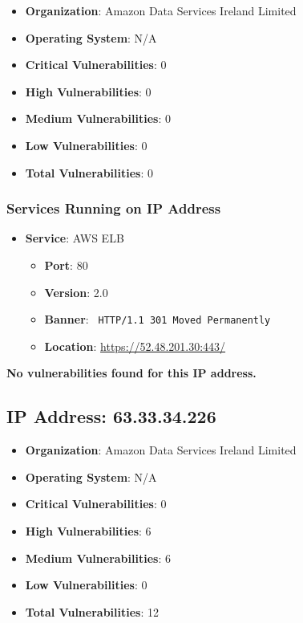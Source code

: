\documentclass{article}
\begin{document}
\begin{itemize}
    \item \textbf{Organization}: Amazon Data Services Ireland Limited
    \item \textbf{Operating System}:  N/A 
    \item \textbf{Critical Vulnerabilities}: 0
    \item \textbf{High Vulnerabilities}: 0
    \item \textbf{Medium Vulnerabilities}: 0
    \item \textbf{Low Vulnerabilities}: 0
    \item \textbf{Total Vulnerabilities}: 0
\end{itemize}

\subsubsection*{Services Running on IP Address}

\begin{itemize}
    
        \item \textbf{Service}: AWS ELB
        \begin{itemize}
            \item \textbf{Port}: 80
            \item \textbf{Version}:  2.0 
            \item \textbf{Banner}: \texttt{
                HTTP/1.1 301 Moved Permanently
            }
            \item \textbf{Location}: \href{ https://52.48.201.30:443/ }{ https://52.48.201.30:443/ }
        \end{itemize}
    
\end{itemize}


\textbf{No vulnerabilities found for this IP address.}




\clearpage



\subsection*{IP Address: 63.33.34.226}

\begin{itemize}
    \item \textbf{Organization}: Amazon Data Services Ireland Limited
    \item \textbf{Operating System}:  N/A 
    \item \textbf{Critical Vulnerabilities}: 0
    \item \textbf{High Vulnerabilities}: 6
    \item \textbf{Medium Vulnerabilities}: 6
    \item \textbf{Low Vulnerabilities}: 0
    \item \textbf{Total Vulnerabilities}: 12
\end{itemize}
\end{document}
